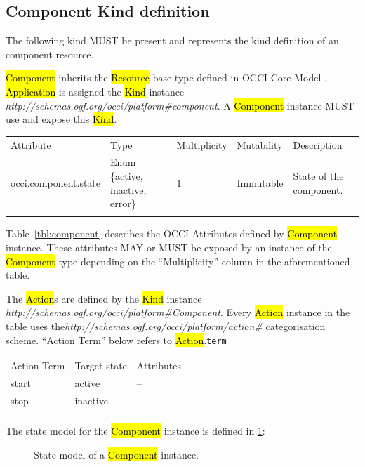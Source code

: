 \documentclass[10pt,a4paper]{article}
\begin{document}
\subsection{Component Kind definition}
The following kind MUST be present and represents the kind definition of an component resource. 

\hl{Component} inherits the \hl{Resource} base type defined in OCCI Core Model \cite{occi:core}. \hl{Application} is assigned the \hl{Kind} instance \textit{http://schemas.ogf.org/occi/platform\#component}. A \hl{Component} instance MUST use and expose this \hl{Kind}.

{
	\begin{tabular}{lp{2.5cm}p{1cm}lp{5cm}}
	\toprule
	Attribute&Type&Multi\-plicity&Mutability&Description\\
	\colrule
	occi.component.state & Enum \{active, inactive, error\} & 1 & Immutable & State of the component.\\
	\botrule
	\end{tabular}
}

Table~\ref{tbl:component} describes the OCCI Attributes defined by \hl{Component} instance. These attributes MAY or MUST be exposed by an instance of the \hl{Component} type depending on the ``Multiplicity'' column in the aforementioned table.

The \hl{Action}s are defined by the \hl{Kind} instance \textit{http://schemas.ogf.org/occi/platform\#Component}. Every \hl{Action} instance in the table uses the\textit{http://schemas.ogf.org/occi/platform/action\#} categorisation scheme. ``Action Term'' below refers to \hl{Action}.{\tt term}

{
	\begin{tabular}{lll}
	\toprule
	Action Term & Target state & Attributes \\
	\colrule
	start & active & -- \\
	stop & inactive & -- \\
	\botrule
	\end{tabular}
}

The state model for the \hl{Component} instance is defined in \ref{fig:component_state}:

\begin{figure}[!h]
	{\centering {} \par}
	\caption{State model of a \hl{Component} instance.}
	\label{fig:component_state}
\end{figure}
\end{document}
